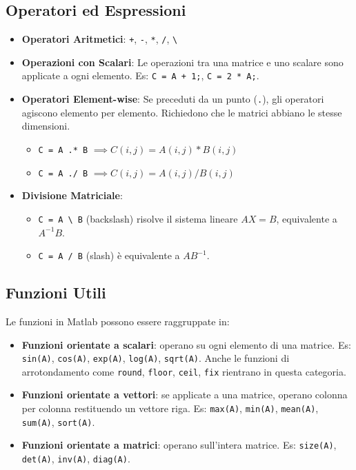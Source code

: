 \subsection{Operatori ed Espressioni}
\begin{itemize}
    \item \textbf{Operatori Aritmetici}: \verb|+|, \verb|-|, \verb|*|, \verb|/|, \verb|\|
    \item \textbf{Operazioni con Scalari}: Le operazioni tra una matrice e uno scalare sono applicate a ogni elemento. Es: \texttt{C = A + 1;}, \texttt{C = 2 * A;}.
    \item \textbf{Operatori Element-wise}: Se preceduti da un punto (\texttt{.}), gli operatori agiscono elemento per elemento. Richiedono che le matrici abbiano le stesse dimensioni.
    \begin{itemize}
        \item \texttt{C = A .* B} $\implies C(i,j) = A(i,j) * B(i,j)$
        \item \texttt{C = A ./ B} $\implies C(i,j) = A(i,j) / B(i,j)$
    \end{itemize}
    \item \textbf{Divisione Matriciale}:
    \begin{itemize}
        \item \verb|C = A \ B| (backslash) risolve il sistema lineare $AX = B$, equivalente a $A^{-1}B$.
        \item \texttt{C = A / B} (slash) è equivalente a $AB^{-1}$.
    \end{itemize}
\end{itemize}

\subsection{Funzioni Utili}
Le funzioni in Matlab possono essere raggruppate in:
\begin{itemize}
    \item \textbf{Funzioni orientate a scalari}: operano su ogni elemento di una matrice. Es: \texttt{sin(A)}, \texttt{cos(A)}, \texttt{exp(A)}, \texttt{log(A)}, \texttt{sqrt(A)}. Anche le funzioni di arrotondamento come \texttt{round}, \texttt{floor}, \texttt{ceil}, \texttt{fix} rientrano in questa categoria.
    \item \textbf{Funzioni orientate a vettori}: se applicate a una matrice, operano colonna per colonna restituendo un vettore riga. Es: \texttt{max(A)}, \texttt{min(A)}, \texttt{mean(A)}, \texttt{sum(A)}, \texttt{sort(A)}.
    \item \textbf{Funzioni orientate a matrici}: operano sull'intera matrice. Es: \texttt{size(A)}, \texttt{det(A)}, \texttt{inv(A)}, \texttt{diag(A)}.
\end{itemize}

